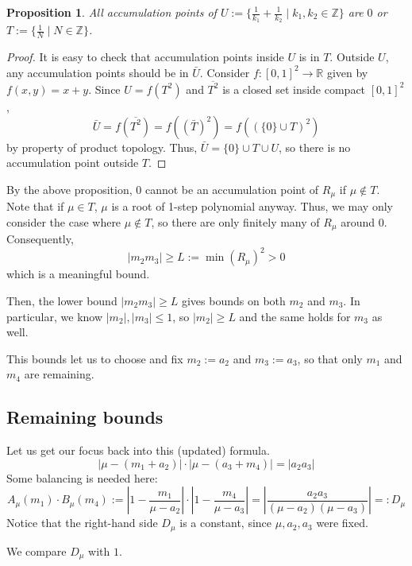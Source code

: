 \documentclass{article}
\theoremstyle{definition}
\theoremstyle{plain}
\newtheorem{proposition}{Proposition}[section]
\theoremstyle{remark}
\numberwithin{equation}{section}
\newcommand{\integer}{\mathbb{Z}}
\newcommand{\real}{\mathbb{R}}
\begin{document}
\begin{proposition}
  All accumulation points of $U := \{ \frac{1}{k_1} + \frac{1}{k_2} \mid k_1, k_2 \in \integer \}$
  are $0$ or $T := \{ \frac{1}{N} \mid N \in \integer \}$.
\end{proposition}
\begin{proof}
  It is easy to check that accumulation points inside $U$ is in $T$.
  Outside $U$, any accumulation points should be in $\bar{U}$.
  Consider $f : [0, 1]^2 \to \real$ given by $f(x, y) = x + y$.
  Since $U = f(T^2)$ and $\overline{T^2}$ is a closed set inside compact $[0,1]^2$,
  \[ \bar{U} = f(\overline{T^2}) = f((\bar{T})^2) = f((\{ 0 \} \cup T)^2) \]
  by property of product topology.
  Thus, $\bar{U} = \{ 0 \} \cup T \cup U$, so there is no accumulation point outside $T$.
\end{proof}

By the above proposition,
$0$ cannot be an accumulation point of $R_\mu$ if $\mu \notin T$.
Note that if $\mu \in T$, $\mu$ is a root of 1-step polynomial anyway.
Thus, we may only consider the case where $\mu \notin T$,
so there are only finitely many of $R_\mu$ around $0$.
Consequently,
\[
  \lvert m_2 m_3 \rvert \geq L := \min(R_\mu)^2 > 0
\]
which is a meaningful bound.

Then, the lower bound $\lvert m_2 m_3 \rvert \geq L$
gives bounds on both $m_2$ and $m_3$.
In particular, we know $\lvert m_2 \rvert, \lvert m_3 \rvert \leq 1$,
so $\lvert m_2 \rvert \geq L$ and the same holds for $m_3$ as well.

This bounds let us to choose and fix $m_2 := a_2$ and $m_3 := a_3$, so that only $m_1$ and $m_4$ are remaining.

\subsection{Remaining bounds}

Let us get our focus back into this (updated) formula.
\[
  \lvert \mu - (m_1 + a_2) \rvert \cdot \lvert \mu - (a_3 + m_4) \rvert = \lvert a_2 a_3 \rvert
\]
Some balancing is needed here:
\[
  A_\mu (m_1) \cdot B_\mu (m_4)
  := \left\lvert 1 - \frac{m_1}{\mu - a_2} \right\rvert \cdot \left\lvert 1 - \frac{m_4}{\mu - a_3} \right\rvert
  = \left\lvert \frac{a_2 a_3}{(\mu - a_2)(\mu - a_3)} \right\rvert =: D_\mu
\]
Notice that the right-hand side $D_\mu$ is a constant, since $\mu, a_2, a_3$ were fixed.

We compare $D_\mu$ with $1$.
\end{document}
